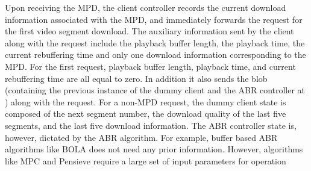 \indent Upon receiving the MPD, the client controller records the current download information associated with the MPD, and immediately forwards the request for the first video segment download. The auxiliary information sent by the client along with the request include the playback buffer length, the playback time, the current rebuffering time  and only one download information corresponding to the MPD.  For the first request, playback buffer length, playback time, and current rebuffering time are all equal to zero. In addition it also sends the blob (containing the previous instance of the dummy client and the ABR controller at \servname) along with the request. For a non-MPD request, the dummy client state is composed of the next segment number, the download quality of the last five segments, and the last five download information. The \ac{ABR} controller state is, however, dictated by the \ac{ABR} algorithm. For example, buffer based \ac{ABR} algorithms like BOLA \cite{Spiteri2016} does not need any prior information. However, algorithms like MPC \cite{Yin2015} and Pensieve \cite{Mao2017} require a large set of input parameters for operation \\


